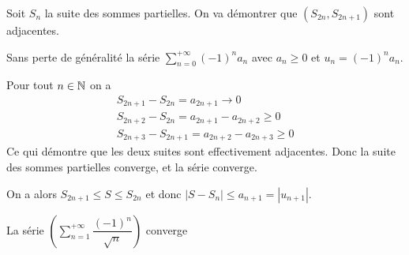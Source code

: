 \documentclass[a4paper, 12pt]{article}
\begin{document}
\begin{demonstration}
    Soit $S_n$ la suite des sommes partielles. On va démontrer que $(S_{2n}, S_{2n+1})$ sont adjacentes.

    Sans perte de généralité la série $\sum\limits_{n=0}^{+\infty} (-1)^n a_n$ avec $a_n \geq 0$ et $u_n = (-1)^n a_n$.

    Pour tout $n \in \mathbb{N}$ on a
    \begin{align*}  
        S_{2n + 1} - S_{2n} = a_{2n+1} \rightarrow 0\\
        S_{2n + 2} - S_{2n} = a_{2n+1} - a_{2n+2} \geq 0\\
        S_{2n + 3} - S_{2n+1} = a_{2n+2} - a_{2n+3} \geq 0
    \end{align*}
    Ce qui démontre que les deux suites sont effectivement adjacentes.
    Donc la suite des sommes partielles converge, et la série converge.

    On a alors $S_{2n + 1} \leq S \leq S_{2n}$ et donc $|S - S_n| \leq a_{n+1} = |u_{n+1}|$.
\end{demonstration}

\begin{exemple}
    La série $\left( \sum\limits_{n=1}^{+\infty}\dfrac{(-1)^n}{\sqrt{n}} \right)$ converge
\end{exemple}
\end{document}
